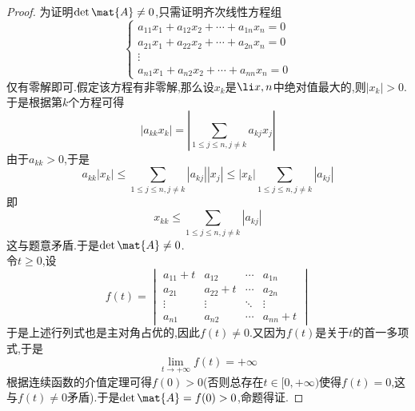 \documentclass{ctexart}
\begin{document}
\begin{proof}
    为证明$\det\mat{A}\neq0$,只需证明齐次线性方程组
    \[\left\{\begin{array}{c}
        a_{11}x_1+a_{12}x_2+\cdots+a_{1n}x_n=0\\
        a_{21}x_1+a_{22}x_2+\cdots+a_{2n}x_n=0\\
        \vdots\\
        a_{n1}x_1+a_{n2}x_2+\cdots+a_{nn}x_n=0
    \end{array}\right.\]
    仅有零解即可.假定该方程有非零解,那么设$x_k$是$\li x,n$中绝对值最大的,则$\left|x_k\right|>0$.于是根据第$k$个方程可得
    \[\left|a_{kk}x_k\right|=\left|\sum_{1\leqslant j\leqslant n,j\neq k}a_{kj}x_j\right|\]
    由于$a_{kk}>0$,于是
    \[a_{kk}\left|x_k\right|\leqslant\sum_{1\leqslant j\leqslant n,j\neq k}\left|a_{kj}\right|\left|x_j\right|\leqslant\left|x_k\right|\sum_{1\leqslant j\leqslant n,j\neq k}\left|a_{kj}\right|\]
    即
    \[x_{kk}\leqslant\sum_{1\leqslant j\leqslant n,j\neq k}\left|a_{kj}\right|\]
    这与题意矛盾.于是$\det\mat{A}\neq0$.\\
    令$t\geqslant0$,设
    \[f(t)=\begin{vmatrix}
        a_{11}+t&a_{12}&\cdots&a_{1n}\\
        a_{21}&a_{22}+t&\cdots&a_{2n}\\
        \vdots&\vdots&\ddots&\vdots\\
        a_{n1}&a_{n2}&\cdots&a_{nn}+t
    \end{vmatrix}\]
    于是上述行列式也是主对角占优的,因此$f(t)\neq0$.又因为$f(t)$是关于$t$的首一多项式,于是
    \[\lim_{t\to+\infty}f(t)=+\infty\]
    根据连续函数的介值定理可得$f(0)>0$(否则总存在$t\in[0,+\infty)$使得$f(t)=0$,这与$f(t)\neq0$矛盾).于是$\det\mat{A}=f(0)>0$,命题得证.
\end{proof}
\end{document}
